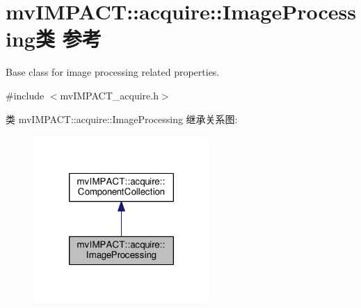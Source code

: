 \hypertarget{classmv_i_m_p_a_c_t_1_1acquire_1_1_image_processing}{\section{mv\+I\+M\+P\+A\+C\+T\+:\+:acquire\+:\+:Image\+Processing类 参考}
\label{classmv_i_m_p_a_c_t_1_1acquire_1_1_image_processing}
}


Base class for image processing related properties.  




{\ttfamily \#include $<$mv\+I\+M\+P\+A\+C\+T\+\_\+acquire.\+h$>$}



类 mv\+I\+M\+P\+A\+C\+T\+:\+:acquire\+:\+:Image\+Processing 继承关系图\+:
\nopagebreak
\begin{figure}[H]
\begin{center}
\leavevmode
\includegraphics[width=190pt]{classmv_i_m_p_a_c_t_1_1acquire_1_1_image_processing__inherit__graph}
\end{center}
\end{figure}


